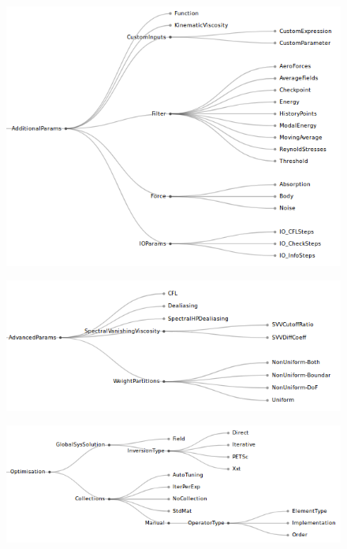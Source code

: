 \documentclass[11pt, a4paper]{report}
\begin{document}
\begin{figure}[tb!]
 \centering
 \includegraphics[width=1\linewidth,  clip=true, trim = .2cm 0cm 0cm 0cm]{AdditionalParameters}
 \label{fig:problemSpecification}
\end{figure}

\begin{figure}[tb!]
 \centering
 \includegraphics[width=1\linewidth,  clip=true, trim = .1cm 0cm 0cm 0cm]{AdvancedParameters}
 \label{fig:problemSpecification}
\end{figure}

\begin{figure}[tb!]
 \centering
 \includegraphics[width=1\linewidth,  clip=true, trim = .2cm 0cm 0cm 0cm]{optimisationb}
 \label{fig:problemSpecification}
\end{figure}
\end{document}
